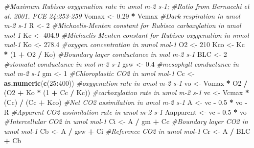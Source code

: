 \documentclass[
]{krantz}
\makeatletter
\newenvironment{Shaded}{\begin{snugshade}}{\end{snugshade}}
\newcommand{\CommentTok}[1]{\textcolor[rgb]{0.56,0.35,0.01}{\textit{#1}}}
\newcommand{\DecValTok}[1]{\textcolor[rgb]{0.00,0.00,0.81}{#1}}
\newcommand{\FloatTok}[1]{\textcolor[rgb]{0.00,0.00,0.81}{#1}}
\newcommand{\KeywordTok}[1]{\textcolor[rgb]{0.13,0.29,0.53}{\textbf{#1}}}
\newcommand{\NormalTok}[1]{#1}
\newcommand{\OperatorTok}[1]{\textcolor[rgb]{0.81,0.36,0.00}{\textbf{#1}}}
\newcommand{\StringTok}[1]{\textcolor[rgb]{0.31,0.60,0.02}{#1}}
\newenvironment{kframe}{%
\medskip{}
\setlength{\fboxsep}{.8em}
 \def\at@end@of@kframe{}%
 \ifinner\ifhmode%
  \def\at@end@of@kframe{\end{minipage}}%
  \begin{minipage}{\columnwidth}%
 \fi\fi%
 \def\FrameCommand##1{\hskip\@totalleftmargin \hskip-\fboxsep
 \colorbox{shadecolor}{##1}\hskip-\fboxsep
     \hskip-\linewidth \hskip-\@totalleftmargin \hskip\columnwidth}%
 \MakeFramed {\advance\hsize-\width
   \@totalleftmargin\z@ \linewidth\hsize
   \@setminipage}}%
 {\par\unskip\endMakeFramed%
 \at@end@of@kframe}
\renewenvironment{Shaded}{\begin{kframe}}{\end{kframe}}
\makeatother
\begin{document}
\begin{Shaded}
\begin{Highlighting}[]
\CommentTok{#Maximum Rubisco oxygenation rate in umol m-2 s-1;}
\CommentTok{#Ratio from Bernacchi et al. 2001. PCE 24:253-259}
\NormalTok{Vomax <-}\StringTok{ }\FloatTok{0.29} \OperatorTok{*}\StringTok{ }\NormalTok{Vcmax}
\CommentTok{#Dark respiration in umol m-2 s-1}
\NormalTok{R <-}\StringTok{ }\DecValTok{2}
\CommentTok{#Michaelis-Menten constant for Rubisco carboxylation in umol mol-1}
\NormalTok{Kc <-}\StringTok{ }\FloatTok{404.9}
\CommentTok{#Michaelis-Menten constant for Rubisco oxygenation in mmol mol-1}
\NormalTok{Ko <-}\StringTok{ }\FloatTok{278.4}
\CommentTok{#oxygen concentration in mmol mol-1}
\NormalTok{O2 <-}\StringTok{ }\DecValTok{210}
\NormalTok{Kco <-}\StringTok{ }\NormalTok{Kc }\OperatorTok{*}\StringTok{ }\NormalTok{(}\DecValTok{1} \OperatorTok{+}\StringTok{ }\NormalTok{O2 }\OperatorTok{/}\StringTok{ }\NormalTok{Ko)}
\CommentTok{#Boundary layer conductance in mol m-2 s-1}
\NormalTok{BLC <-}\StringTok{ }\DecValTok{2}
\CommentTok{#stomatal conductance in mol m-2 s-1}
\NormalTok{gsw <-}\StringTok{ }\FloatTok{0.4}
\CommentTok{#mesophyll conductance in mol m-2 s-1}
\NormalTok{gm <-}\StringTok{ }\DecValTok{1}
\CommentTok{#Chloroplastic CO2 in umol mol-1}
\NormalTok{Cc <-}\StringTok{ }\KeywordTok{as.numeric}\NormalTok{(}\KeywordTok{c}\NormalTok{(}\DecValTok{25}\OperatorTok{:}\DecValTok{400}\NormalTok{))}
\CommentTok{#oxygenation rate in umol m-2 s-1}
\NormalTok{vo <-}\StringTok{ }\NormalTok{Vomax }\OperatorTok{*}\StringTok{ }\NormalTok{O2 }\OperatorTok{/}\StringTok{ }\NormalTok{(O2 }\OperatorTok{+}\StringTok{ }\NormalTok{Ko }\OperatorTok{*}\StringTok{ }\NormalTok{(}\DecValTok{1} \OperatorTok{+}\StringTok{ }\NormalTok{Cc }\OperatorTok{/}\StringTok{ }\NormalTok{Kc))}
\CommentTok{#carboxylation rate in umol m-2 s-1}
\NormalTok{vc <-}\StringTok{ }\NormalTok{Vcmax }\OperatorTok{*}\StringTok{ }\NormalTok{(Cc) }\OperatorTok{/}\StringTok{ }\NormalTok{(Cc }\OperatorTok{+}\StringTok{ }\NormalTok{Kco)}
\CommentTok{#Net CO2 assimilation in umol m-2 s-1}
\NormalTok{A <-}\StringTok{ }\NormalTok{vc }\OperatorTok{-}\StringTok{ }\FloatTok{0.5} \OperatorTok{*}\StringTok{ }\NormalTok{vo }\OperatorTok{-}\StringTok{ }\NormalTok{R}
\CommentTok{#Apparent CO2 assimilation rate in umol m-2 s-1}
\NormalTok{Aapparent <-}\StringTok{ }\NormalTok{vc }\OperatorTok{-}\StringTok{ }\FloatTok{0.5} \OperatorTok{*}\StringTok{ }\NormalTok{vo}
\CommentTok{#Intercellular CO2 in umol mol-1}
\NormalTok{Ci <-}\StringTok{ }\NormalTok{A }\OperatorTok{/}\StringTok{ }\NormalTok{gm }\OperatorTok{+}\StringTok{ }\NormalTok{Cc}
\CommentTok{#Boundary layer CO2 in umol mol-1}
\NormalTok{Cb <-}\StringTok{ }\NormalTok{A }\OperatorTok{/}\StringTok{ }\NormalTok{gsw }\OperatorTok{+}\StringTok{ }\NormalTok{Ci}
\CommentTok{#Reference CO2 in umol mol-1}
\NormalTok{Cr <-}\StringTok{ }\NormalTok{A }\OperatorTok{/}\StringTok{ }\NormalTok{BLC }\OperatorTok{+}\StringTok{ }\NormalTok{Cb}


\end{Highlighting}
\end{Shaded}
\end{document}
